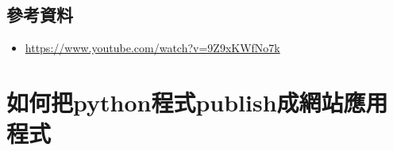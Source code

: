 \documentclass[a4paper,12pt]{article}
\begin{document}
\subsection{參考資料}
\label{sec:orgf064e47}
\begin{itemize}
\item \url{https://www.youtube.com/watch?v=9Z9xKWfNo7k}\\
\end{itemize}


\section{如何把python程式publish成網站應用程式}
\label{sec:org2927c7e}
\end{document}
